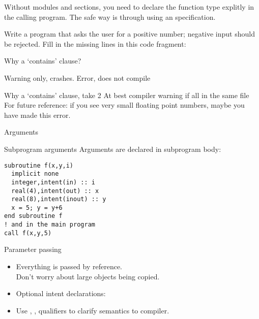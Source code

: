\begin{f77note}
  Without modules and  sections, you need to declare the
  function type explitly in the calling program. The safe way is
  through using an  specification.
\end{f77note}

\begin{exercise}
  \label{ex:freadpos}
  Write a program that asks the user for a positive number; negative
  input should be rejected.  Fill in the missing lines in this code
  fragment:
\end{exercise}

\begin{block}{Why a `contains' clause?}
  \label{sl:whycontain}
  \begin{multicols}{2}
    Warning only, crashes.
    \vfill\columnbreak
    Error, does not compile
  \end{multicols}
\end{block}

\begin{block}{Why a `contains' clause, take 2}
  \label{sl:whycontain_type}
  At best compiler warning if all in the same file\\
  For future reference: if you see very small floating point numbers,
  maybe you have made this error.
\end{block}

 {Arguments}

\begin{block}{Subprogram arguments}
  \label{sl:farguments}
 Arguments are declared in subprogram body:
\begin{verbatim}
subroutine f(x,y,i)
  implicit none
  integer,intent(in) :: i
  real(4),intent(out) :: x
  real(8),intent(inout) :: y
  x = 5; y = y+6
end subroutine f
! and in the main program
call f(x,y,5)
\end{verbatim}
\end{block}

\begin{block}{Parameter passing}
  \label{sl:fpassing}
  \begin{itemize}
  \item Everything is passed by reference.\\
    Don't worry about large objects being copied.
  \item Optional intent declarations:
  \item Use , ,  qualifiers to clarify semantics
    to compiler.
  \end{itemize}
\end{block}

